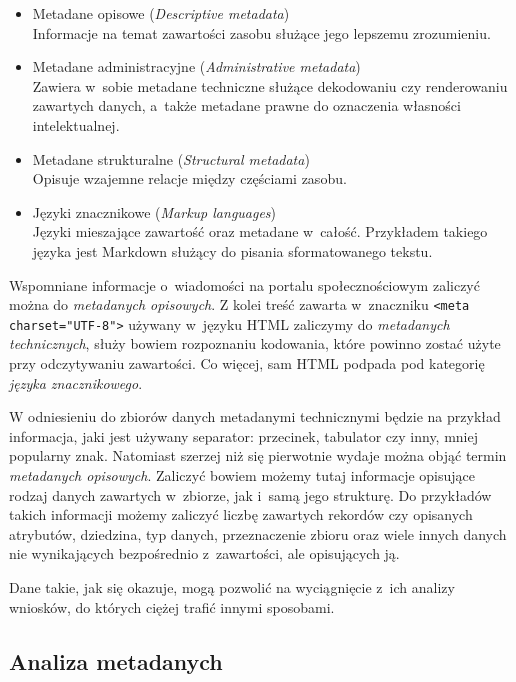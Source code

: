 	\begin{itemize}
		\item Metadane opisowe (\emph{Descriptive metadata}) \\
		Informacje na temat zawartości zasobu służące jego lepszemu zrozumieniu.

		\item Metadane administracyjne (\emph{Administrative metadata}) \\
		Zawiera w~sobie metadane techniczne służące dekodowaniu czy renderowaniu zawartych danych, a~także metadane prawne do oznaczenia własności intelektualnej.

		\item Metadane strukturalne (\emph{Structural metadata}) \\
		Opisuje wzajemne relacje między częściami zasobu.

		\item Języki znacznikowe (\emph{Markup languages}) \\
		Języki mieszające zawartość oraz metadane w~całość.
		Przykładem takiego języka jest Markdown służący do pisania sformatowanego tekstu.
	\end{itemize}

	Wspomniane informacje o~wiadomości na portalu społecznościowym zaliczyć można do \emph{metadanych opisowych}.
	Z kolei treść zawarta w~znaczniku \lstinline{<meta charset="UTF-8">} używany w~języku HTML zaliczymy do \emph{metadanych technicznych}, służy bowiem rozpoznaniu kodowania, które powinno zostać użyte przy odczytywaniu zawartości.
	Co więcej, sam HTML podpada pod kategorię \emph{języka znacznikowego}.

	W odniesieniu do zbiorów danych metadanymi technicznymi będzie na przykład informacja, jaki jest używany separator: przecinek, tabulator czy inny, mniej popularny znak.
	Natomiast szerzej niż się pierwotnie wydaje można objąć termin \emph{metadanych opisowych}.
	Zaliczyć bowiem możemy tutaj informacje opisujące rodzaj danych zawartych w~zbiorze, jak i~samą jego strukturę.
	Do przykładów takich informacji możemy zaliczyć liczbę zawartych rekordów czy opisanych atrybutów, dziedzina, typ danych, przeznaczenie zbioru oraz wiele innych danych nie wynikających bezpośrednio z~zawartości, ale opisujących ją.

	Dane takie, jak się okazuje, mogą pozwolić na wyciągnięcie z~ich analizy wniosków, do których ciężej trafić innymi sposobami.

	\subsection{Analiza metadanych}

